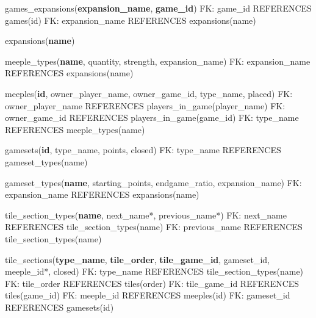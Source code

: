 games\_expansions(\textbf{expansion\_name}, \textbf{game\_id})\newline
FK: game\_id REFERENCES games(id)\newline
FK: expansion\_name REFERENCES expansions(name)\newline

expansions(\textbf{name})\newline

meeple\_types(\textbf{name}, quantity, strength, expansion\_name)\newline
FK: expansion\_name REFERENCES expansions(name)\newline

meeples(\textbf{id}, owner\_player\_name, owner\_game\_id, type\_name, placed)\newline
FK: owner\_player\_name REFERENCES players\_in\_game(player\_name)\newline
FK: owner\_game\_id REFERENCES players\_in\_game(game\_id)\newline
FK: type\_name REFERENCES meeple\_types(name)\newline

gamesets(\textbf{id}, type\_name, points, closed)\newline
FK: type\_name REFERENCES gameset\_types(name)\newline

gameset\_types(\textbf{name}, starting\_points, endgame\_ratio, expansion\_name)\newline
FK: expansion\_name REFERENCES expansions(name)\newline

tile\_section\_types(\textbf{name}, next\_name*, previous\_name*)\newline
FK: next\_name REFERENCES tile\_section\_types(name)\newline
FK: previous\_name REFERENCES tile\_section\_types(name)\newline

tile\_sections(\textbf{type\_name}, \textbf{tile\_order}, \textbf{tile\_game\_id}, gameset\_id, meeple\_id*, closed)\newline
FK: type\_name REFERENCES tile\_section\_types(name)\newline
FK: tile\_order REFERENCES tiles(order)\newline
FK: tile\_game\_id REFERENCES tiles(game\_id)\newline
FK: meeple\_id REFERENCES meeples(id)\newline
FK: gameset\_id REFERENCES gamesets(id)\newline

